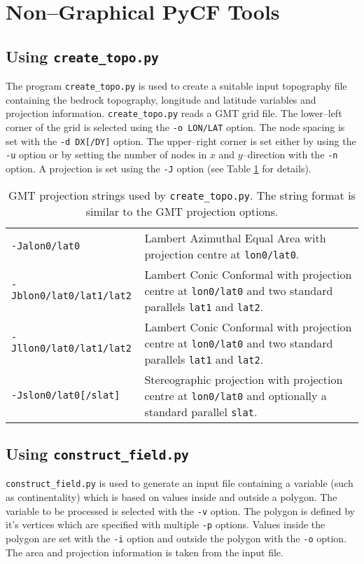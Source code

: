 \section{Non--Graphical PyCF Tools}
\subsection{Using \texttt{create\_topo.py}}
The program \texttt{create\_topo.py} is used to create a suitable input topography file containing the bedrock topography, longitude and latitude variables and projection information. \texttt{create\_topo.py} reads a GMT grid file. The lower--left corner of the grid is selected using the \texttt{-o LON/LAT} option. The node spacing is set with the \texttt{-d DX[/DY]} option. The upper--right corner is set either by using the \texttt{-u} option or by setting the number of nodes in $x$ and $y$--direction with the \texttt{-n} option. A projection is set using the \texttt{-J} option (see Table \ref{tg.tab.create_topo} for details). 

\begin{table}[htbp]
  \centering
  \begin{tabular}{|p{}|p{}|}
    \hline
    \texttt{-Jalon0/lat0} & Lambert Azimuthal Equal Area with projection centre at \texttt{lon0/lat0}. \\
    \texttt{-Jblon0/lat0/lat1/lat2} & Lambert Conic Conformal with projection centre at \texttt{lon0/lat0} and two standard parallels \texttt{lat1} and \texttt{lat2}. \\
    \texttt{-Jllon0/lat0/lat1/lat2} & Lambert Conic Conformal with projection centre at \texttt{lon0/lat0} and two standard parallels \texttt{lat1} and \texttt{lat2}. \\
    \texttt{-Jslon0/lat0[/slat]} & Stereographic projection with projection centre at \texttt{lon0/lat0} and optionally a standard parallel \texttt{slat}.\\
    \hline
  \end{tabular}
  \caption{GMT projection strings used by \texttt{create\_topo.py}. The string format is similar to the GMT projection options.}
  \label{tg.tab.create_topo}
\end{table}

\subsection{Using \texttt{construct\_field.py}}\label{tg.sec.cfield}
\texttt{construct\_field.py} is used to generate an input file containing a variable (such as continentality) which is based on values inside and outside a polygon. The variable to be processed is selected with the \texttt{-v} option. The polygon is defined by it's vertices which are specified with multiple \texttt{-p} options. Values inside the polygon are set with the \texttt{-i} option and outside the polygon with the \texttt{-o} option. The area and projection information is taken from the input file. 

